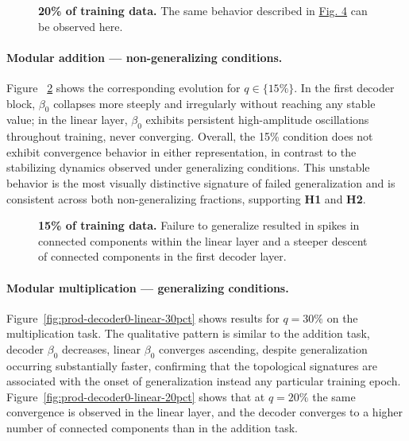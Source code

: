 \begin{figure}[htbp]
    \centering
    \hfill
    
    \caption[20\% of training data.]{\textbf{20\% of training data.} The same behavior described in \hyperref[fig:sum-decoder0-linear-30pct]{Fig. 4} can be observed here.}
    \label{fig:sum-decoder0-linear-20pct}
\end{figure}

\paragraph{Modular addition — non-generalizing conditions.}
Figure ~\ref{fig:sum-decoder0-linear-15pct} shows the corresponding evolution for $q \in \{15\%\}$. In the first decoder block, $\beta_0$ collapses more steeply and irregularly without reaching any stable value; in the linear layer, $\beta_0$ exhibits persistent high-amplitude oscillations throughout training, never converging. Overall, the 15\% condition does not exhibit convergence behavior in either representation, in contrast to the stabilizing dynamics observed under generalizing conditions. This unstable behavior is the most visually distinctive signature of failed generalization and is consistent across both non-generalizing fractions, supporting \textbf{H1} and \textbf{H2}.

\begin{figure}[htbp]
    \centering
    \hfill
    
    \caption[15\% of training data.]{\textbf{15\% of training data.} Failure to generalize resulted in spikes in connected components within the linear layer and a steeper descent of connected components in the first decoder layer.}
    \label{fig:sum-decoder0-linear-15pct}
\end{figure}


\paragraph{Modular multiplication — generalizing conditions.}
Figure~\ref{fig:prod-decoder0-linear-30pct} shows results for $q = 30\%$ on the multiplication task. The qualitative pattern is similar to the addition task,  decoder $\beta_0$ decreases, linear $\beta_0$ converges ascending, despite generalization occurring substantially faster, confirming that the topological signatures are associated with the onset of generalization instead any particular training epoch. Figure~\ref{fig:prod-decoder0-linear-20pct} shows that at $q = 20\%$ the same convergence is observed in the linear layer, and the decoder converges to a higher number of connected components than in the addition task.

